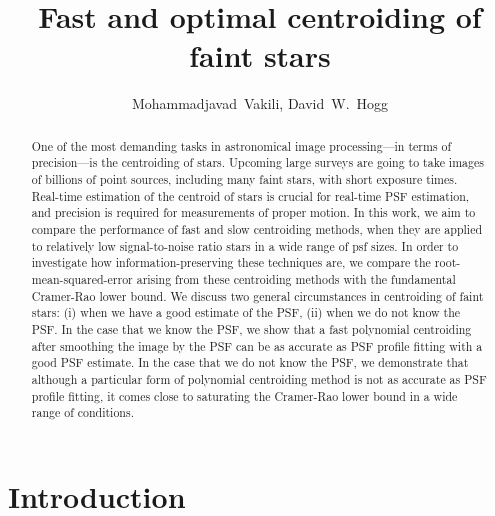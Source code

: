 \documentclass[12pt, preprint]{aastex}
\begin{document}
\author{
  Mohammadjavad~Vakili,
  David~W.~Hogg
}

\title{Fast and optimal centroiding of faint stars}

\begin{abstract}
One of the most demanding tasks in astronomical image processing---in terms of precision---is the centroiding of stars. 
Upcoming large surveys are going to take images of billions of point sources, 
including many faint stars, with short exposure times. Real-time estimation of the
centroid of stars is crucial for real-time PSF estimation, and precision is required
for measurements of proper motion. In this work, we aim to compare the performance of
fast and slow centroiding methods, when they are applied
to relatively low signal-to-noise ratio stars in a wide range of psf sizes.
In order to investigate how information-preserving these techniques are, we compare
the root-mean-squared-error arising from these centroiding methods with the fundamental Cramer-Rao
lower bound. We discuss two general circumstances in centroiding of faint stars: (i) when we have a good estimate
of the PSF, (ii) when we do not know the PSF. In the case that we know the PSF, we show that a fast
 polynomial centroiding after smoothing the image by the PSF can be 
as accurate as PSF profile fitting with a good PSF estimate. In the case that we do not
know the PSF, we demonstrate that although a particular form of polynomial centroiding method is not as
accurate as PSF profile fitting, it comes close to saturating the Cramer-Rao lower bound
in a wide range of conditions.    

\end{abstract}

\section{Introduction}
\end{document}
